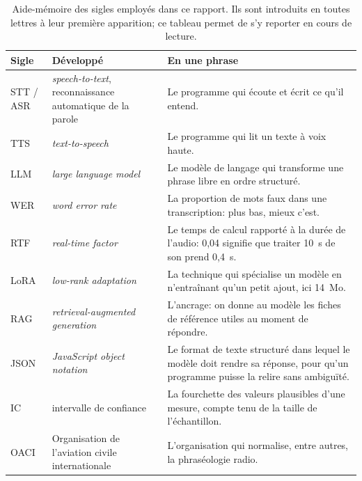 \documentclass[11pt,a4paper]{article}
\begin{document}
\begin{table}[!htbp]
\centering
\caption[Aide-mémoire des sigles employés dans ce rapport]{Aide-mémoire des sigles employés dans ce rapport. Ils sont introduits en toutes
lettres à leur première apparition; ce tableau permet de s'y reporter en cours de lecture.}
\label{tab:sigles}
\small
\begin{tabular}{>{\raggedright\arraybackslash}p{1.7cm} >{\raggedright\arraybackslash}p{4.4cm} >{\raggedright\arraybackslash}p{8.9cm}}
\toprule
\rowcolor{lightgray}\textbf{Sigle} & \textbf{Développé} & \textbf{En une phrase}\\
\midrule
STT / ASR & \emph{speech-to-text}, reconnaissance automatique de la parole & Le programme qui écoute et écrit ce qu'il entend.\\
TTS & \emph{text-to-speech} & Le programme qui lit un texte à voix haute.\\
LLM & \emph{large language model} & Le modèle de langage qui transforme une phrase libre en ordre structuré.\\
WER & \emph{word error rate} & La proportion de mots faux dans une transcription: plus bas, mieux c'est.\\
RTF & \emph{real-time factor} & Le temps de calcul rapporté à la durée de l'audio: 0,04 signifie que traiter 10~s de son prend 0,4~s.\\
LoRA & \emph{low-rank adaptation} & La technique qui spécialise un modèle en n'entraînant qu'un petit ajout, ici 14~Mo.\\
RAG & \emph{retrieval-augmented generation} & L'ancrage: on donne au modèle les fiches de référence utiles au moment de répondre.\\
JSON & \emph{JavaScript object notation} & Le format de texte structuré dans lequel le modèle doit rendre sa réponse, pour qu'un programme puisse la relire sans ambiguïté.\\
IC & intervalle de confiance & La fourchette des valeurs plausibles d'une mesure, compte tenu de la taille de l'échantillon.\\
OACI & Organisation de l'aviation civile internationale & L'organisation qui normalise, entre autres, la phraséologie radio.\\
\bottomrule
\end{tabular}
\end{table}
\end{document}
